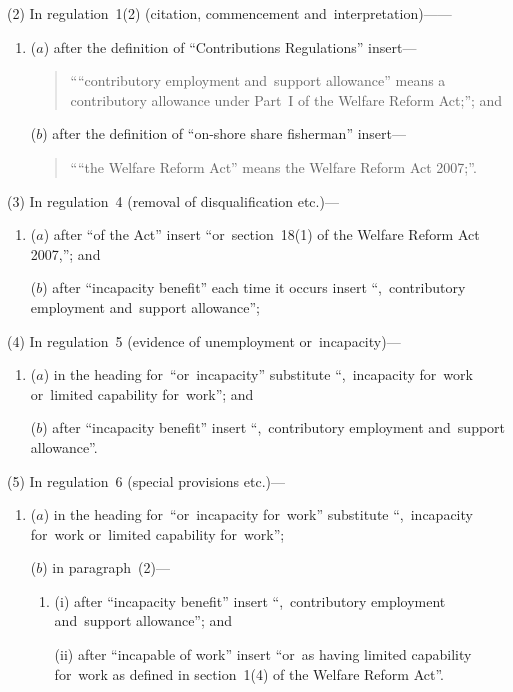 \documentclass[12pt,a4paper]{article}
\begin{document}
(2) In regulation~1(2) (citation, commencement and~interpretation)——
\begin{enumerate}\item[]
($a$) after the definition of “Contributions Regulations” insert—
\begin{quotation}
““contributory employment and~support allowance” means a contributory allowance under Part~I of the Welfare Reform Act;”; and
\end{quotation}

($b$) after the definition of “on-shore share fisherman” insert—
\begin{quotation}
““the Welfare Reform Act” means the Welfare Reform Act 2007;”.
\end{quotation}
\end{enumerate}

(3) In regulation~4 (removal of disqualification etc.)—
\begin{enumerate}\item[]
($a$) after “of the Act” insert “or~section~18(1) of the Welfare Reform Act 2007,”; and

($b$) after “incapacity benefit” each time it occurs insert “,~contributory employment and~support allowance”;
\end{enumerate}

(4) In regulation~5 (evidence of unemployment or~incapacity)—
\begin{enumerate}\item[]
($a$) in the heading for~“or~incapacity” substitute “,~incapacity for~work or~limited capability for~work”; and

($b$) after “incapacity benefit” insert “,~contributory employment and~support allowance”.
\end{enumerate}

(5) In regulation~6 (special provisions etc.)—
\begin{enumerate}\item[]
($a$) in the heading for~“or~incapacity for~work” substitute “,~incapacity for~work or~limited capability for~work”;

($b$) in paragraph~(2)—
\begin{enumerate}\item[]
(i) after “incapacity benefit” insert “,~contributory employment and~support allowance”; and

(ii) after “incapable of work” insert “or~as having limited capability for~work as defined in section~1(4) of the Welfare Reform Act”.
\end{enumerate}
\end{enumerate}
\end{document}
